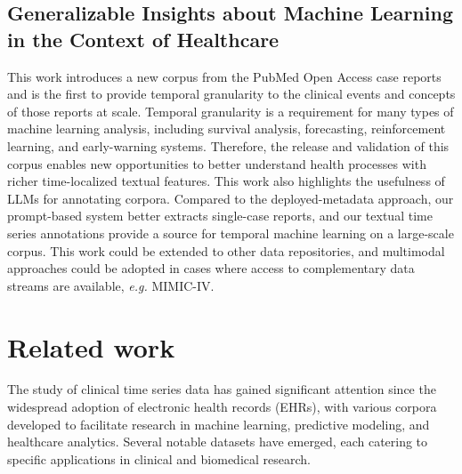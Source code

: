 \documentclass[pmlr]{jmlr}%
\begin{document}
\subsection*{Generalizable Insights about Machine Learning in the Context of Healthcare}
This work introduces a new corpus from the PubMed Open Access case reports and is the first to provide temporal granularity to the clinical events and concepts of those reports at scale.
Temporal granularity is a requirement for many types of machine learning analysis, including survival analysis, forecasting, reinforcement learning, and early-warning systems.
Therefore, the release and validation of this corpus enables new opportunities to better understand health processes with richer time-localized textual features.  
This work also highlights the usefulness of LLMs for annotating corpora.
Compared to the deployed-metadata approach, our prompt-based system better extracts single-case reports, and our textual time series annotations provide a source for temporal machine learning on a large-scale corpus.
This work could be extended to other data repositories, and multimodal approaches could be adopted in cases where access to complementary data streams are available, \emph{e.g.} MIMIC-IV.


\section{Related work}
The study of clinical time series data has gained significant attention since the widespread adoption of electronic health records (EHRs), with various corpora developed to facilitate research in machine learning, predictive modeling, and healthcare analytics. Several notable datasets have emerged, each catering to specific applications in clinical and biomedical research.
\end{document}
